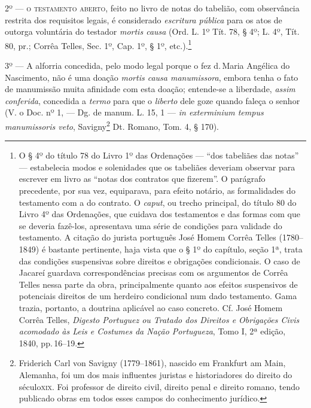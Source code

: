2º --- \textsc{o testamento aberto}, feito no livro de notas do tabelião, com
observância restrita dos requisitos legais, é considerado
\emph{escritura pública} para os atos de outorga voluntária do testador
\emph{mortis causa} (Ord. L. 1º Tít. 78, § 4º; L. 4º, Tít. 80, pr.;
Corrêa Telles, Sec. 1º, Cap. 1º, § 1º, etc.).\footnote{ O § 4º do
  título 78 do Livro 1º das Ordenações --- ``dos tabeliães das notas'' ---
  estabelecia modos e solenidades que os tabeliães deveriam observar
  para escrever em livro as ``notas dos contratos que fizerem''. O
  parágrafo precedente, por sua vez, equiparava, para efeito notário, as
  formalidades do testamento com a do contrato. O \emph{caput}, ou
  trecho principal, do título 80 do Livro 4º das Ordenações, que cuidava
  dos testamentos e das formas com que se deveria fazê-los, apresentava
  uma série de condições para validade do testamento. A citação do
  jurista português José Homem Corrêa Telles (1780--1849) é bastante
  pertinente, haja vista que o § 1º do capítulo, seção 1ª, trata das
  condições suspensivas sobre direitos e obrigações condicionais. O caso
  de Jacareí guardava correspondências precisas com os argumentos de
  Corrêa Telles nessa parte da obra, principalmente quanto aos efeitos
  suspensivos de potenciais direitos de um herdeiro condicional num dado
  testamento. Gama trazia, portanto, a doutrina aplicável ao caso
  concreto. Cf. José Homem Corrêa Telles, \emph{Digesto Portuguez ou
  Tratado dos Direitos e Obrigações Civis acomodado às Leis e Costumes
  da Nação Portugueza}, Tomo I, 2ª edição, 1840, pp.\,16--19.}

3º --- A alforria concedida, pelo modo legal porque o fez d.\,Maria
Angélica do Nascimento, não é uma doação \emph{mortis causa
manumissora}, embora tenha o fato de manumissão muita afinidade com esta
doação; entende-se a liberdade, \emph{assim conferida}, concedida a
\emph{termo} para que o \emph{liberto} dele goze quando faleça o senhor
(V. o Doc. nº 1, --- Dg. de manum. L. 15, 1 --- \emph{in exterminium
tempus manumissoris veto}, Savigny\footnote{ Friderich Carl von Savigny
  (1779--1861), nascido em Frankfurt am Main, Alemanha, foi um dos mais
  influentes juristas e historiadores do direito do século\textsc{xix}. Foi
  professor de direito civil, direito penal e direito romano, tendo
  publicado obras em todos esses campos do conhecimento jurídico.} Dt.
Romano, Tom. 4, § 170).

